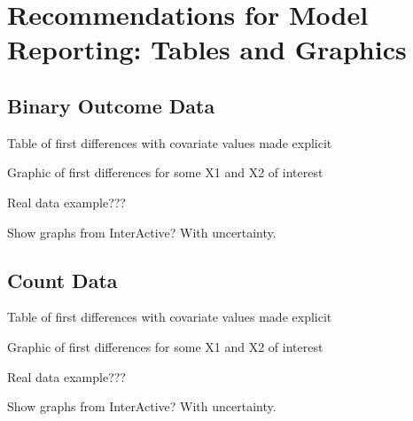 \documentclass[jou, apacite]{apa6}
\begin{document}
\section{Recommendations for Model Reporting: Tables and Graphics}
\subsection{Binary Outcome Data}
Table of first differences with covariate values made explicit

Graphic of first differences for some X1 and X2 of interest	

Real data example???

Show graphs from InterActive? With uncertainty.

\subsection{Count Data}
Table of first differences with covariate values made explicit

Graphic of first differences for some X1 and X2 of interest

Real data example???

Show graphs from InterActive? With uncertainty.
\end{document}

